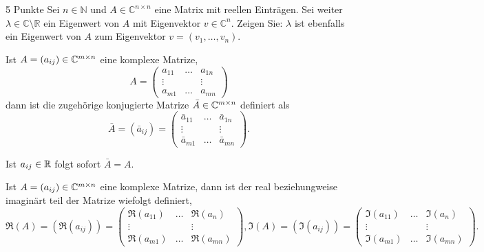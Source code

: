 \documentclass{problemset}
\begin{document}
\begin{problem}{5 Punkte}
Sei $n \in \mathbb{N}$ und $A \in \mathbb{C}^{n \times n}$ eine Matrix mit
reellen Einträgen. Sei weiter $\lambda \in \mathbb{C} \setminus \mathbb{R}$ ein
Eigenwert von $A$ mit Eigenvektor $v \in \mathbb{C}^n$. Zeigen Sie: $\lambda$
ist ebenfalls ein Eigenwert von $A$ zum Eigenvektor $v = (v_1, \dots, v_n)$.

\begin{definition}
    Ist \(A = (a_{ij}) \in \mathbb{C}^{m \times n}\) eine komplexe Matrize,
    \[
        A=
        \begin{pmatrix}
            a_{11} & \dots & a_{1n} \\
            \vdots &       & \vdots \\
            a_{m1} & \dots & a_{mn}
        \end{pmatrix}
    \]
    dann ist die zugehörige konjugierte Matrize \(\bar{A} \in \mathbb{C}^{m
    \times n}\) definiert als \[
        \bar{A} = (\bar{a}_{ij}) = \begin{pmatrix}
            \bar{a}_{11} & \dots & \bar{a}_{1n} \\
            \vdots       &       & \vdots       \\
            \bar{a}_{m1} & \dots & \bar{a}_{mn}
        \end{pmatrix}.
    \]

    Ist \(a_{ij} \in \mathbb{R}\) folgt sofort \(\bar{A} = A\).
\end{definition}

\begin{definition}
    Ist \(A = (a_{ij}) \in \mathbb{C}^{m \times n}\) eine komplexe Matrize,
    dann ist der real beziehungweise imaginärt teil der Matrize wiefolgt definiert, \[
        \Re(A) = (\Re(a_{ij})) = \begin{pmatrix}
            \Re(a_{11}) & \dots & \Re(a_{n})  \\
            \vdots      &       & \vdots      \\
            \Re(a_{m1}) & \dots & \Re(a_{mn})
        \end{pmatrix}, \Im(A) = (\Im(a_{ij})) = \begin{pmatrix}
            \Im(a_{11}) & \dots & \Im(a_{n})  \\
            \vdots      &       & \vdots      \\
            \Im(a_{m1}) & \dots & \Im(a_{mn})
        \end{pmatrix}.
    \]


\end{definition}
\end{problem}
\end{document}
